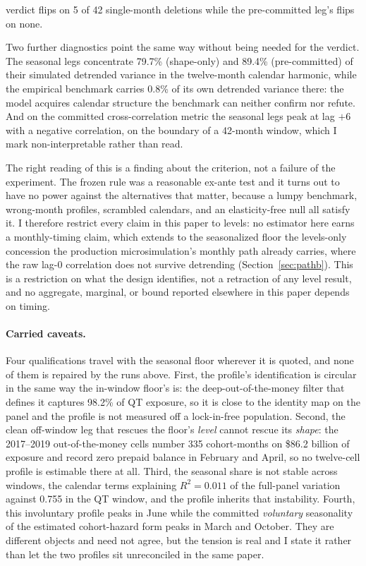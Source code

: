 \documentclass[12pt]{article}
\begin{document}
verdict flips on 5 of 42 single-month deletions while the pre-committed leg's flips on none.

Two further diagnostics point the same way without being needed for the verdict. The seasonal legs concentrate 79.7\% (shape-only) and 89.4\% (pre-committed) of their simulated detrended variance in the twelve-month calendar harmonic, while the empirical benchmark carries 0.8\% of its own detrended variance there: the model acquires calendar structure the benchmark can neither confirm nor refute. And on the committed cross-correlation metric the seasonal legs peak at lag $+6$ with a negative correlation, on the boundary of a 42-month window, which I mark non-interpretable rather than read.

The right reading of this is a finding about the criterion, not a failure of the experiment. The frozen rule was a reasonable ex-ante test and it turns out to have no power against the alternatives that matter, because a lumpy benchmark, wrong-month profiles, scrambled calendars, and an elasticity-free null all satisfy it. I therefore restrict every claim in this paper to levels: no estimator here earns a monthly-timing claim, which extends to the seasonalized floor the levels-only concession the production microsimulation's monthly path already carries, where the raw lag-0 correlation does not survive detrending (Section~\ref{sec:pathb}). This is a restriction on what the design identifies, not a retraction of any level result, and no aggregate, marginal, or bound reported elsewhere in this paper depends on timing.

\paragraph{Carried caveats.} Four qualifications travel with the seasonal floor wherever it is quoted, and none of them is repaired by the runs above. First, the profile's identification is circular in the same way the in-window floor's is: the deep-out-of-the-money filter that defines it captures 98.2\% of QT exposure, so it is close to the identity map on the panel and the profile is not measured off a lock-in-free population. Second, the clean off-window leg that rescues the floor's \emph{level} cannot rescue its \emph{shape}: the 2017--2019 out-of-the-money cells number 335 cohort-months on \$86.2 billion of exposure and record zero prepaid balance in February and April, so no twelve-cell profile is estimable there at all. Third, the seasonal share is not stable across windows, the calendar terms explaining $R^2 = 0.011$ of the full-panel variation against 0.755 in the QT window, and the profile inherits that instability. Fourth, this involuntary profile peaks in June while the committed \emph{voluntary} seasonality of the estimated cohort-hazard form peaks in March and October. They are different objects and need not agree, but the tension is real and I state it rather than let the two profiles sit unreconciled in the same paper.
\end{document}
